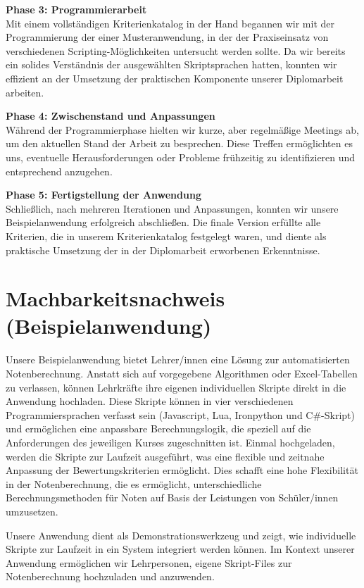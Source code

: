 \textbf{Phase 3: Programmierarbeit}\\
Mit einem vollständigen Kriterienkatalog in der Hand begannen wir mit der 
Programmierung der einer Musteranwendung, in der der Praxiseinsatz von verschiedenen 
Scripting-Möglichkeiten untersucht werden sollte. Da wir bereits ein solides Verständnis 
der ausgewählten Skriptsprachen hatten, konnten wir effizient an der Umsetzung der praktischen 
Komponente unserer Diplomarbeit arbeiten.

\textbf{Phase 4: Zwischenstand und Anpassungen}\\
Während der Programmierphase hielten wir kurze, aber regelmäßige Meetings ab, 
um den aktuellen Stand der Arbeit zu besprechen. Diese Treffen ermöglichten es uns, 
eventuelle Herausforderungen oder Probleme frühzeitig zu identifizieren und entsprechend anzugehen.

\textbf{Phase 5: Fertigstellung der Anwendung}\\
Schließlich, nach mehreren Iterationen und Anpassungen, konnten wir unsere Beispielanwendung 
erfolgreich abschließen. Die finale Version erfüllte alle Kriterien, die in 
unserem Kriterienkatalog festgelegt waren, und diente als praktische Umsetzung 
der in der Diplomarbeit erworbenen Erkenntnisse.


\newpage
\section{Machbarkeitsnachweis (Beispielanwendung)}

Unsere Beispielanwendung bietet Lehrer/innen eine Lösung zur automatisierten Notenberechnung. 
Anstatt sich auf vorgegebene Algorithmen oder Excel-Tabellen zu verlassen, 
können Lehrkräfte ihre eigenen individuellen Skripte direkt in die Anwendung hochladen. 
Diese Skripte können in vier verschiedenen Programmiersprachen verfasst sein 
(Javascript, Lua, Ironpython und C\#-Skript) und ermöglichen eine anpassbare Berechnungslogik, 
die speziell auf die Anforderungen des jeweiligen Kurses zugeschnitten ist. Einmal hochgeladen, 
werden die Skripte zur Laufzeit ausgeführt, was eine flexible und zeitnahe Anpassung der 
Bewertungskriterien ermöglicht. Dies schafft eine hohe Flexibilität in der Notenberechnung, 
die es ermöglicht, unterschiedliche Berechnungsmethoden für Noten auf Basis der Leistungen von
Schüler/innen umzusetzen.

Unsere Anwendung dient als Demonstrationswerkzeug und zeigt, wie individuelle Skripte zur 
Laufzeit in ein System integriert werden können. Im Kontext unserer Anwendung ermöglichen wir 
Lehrpersonen, eigene Skript-Files zur Notenberechnung hochzuladen und anzuwenden.

